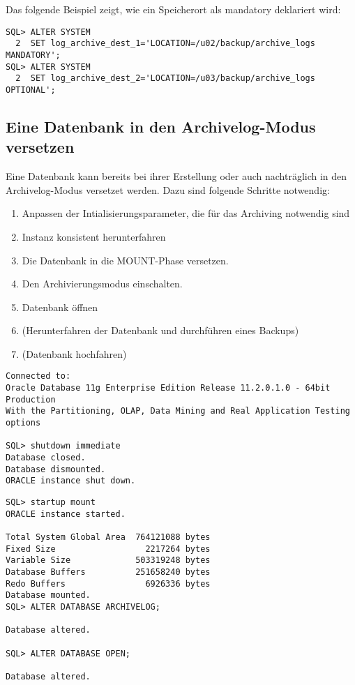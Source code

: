           Das folgende Beispiel zeigt, wie ein Speicherort als mandatory deklariert wird:
          \begin{lstlisting}[caption={\parameter{log\_archive\_dest\_n} als mandatory deklarieren},label=admin51,language=oracle_sql]
SQL> ALTER SYSTEM
  2  SET log_archive_dest_1='LOCATION=/u02/backup/archive_logs MANDATORY';
SQL> ALTER SYSTEM
  2  SET log_archive_dest_2='LOCATION=/u03/backup/archive_logs OPTIONAL';
          \end{lstlisting}
      \subsection{Eine Datenbank in den Archivelog-Modus versetzen}
        Eine Datenbank kann bereits bei ihrer Erstellung oder auch nachträglich in den Archivelog-Modus versetzet werden. Dazu sind folgende Schritte notwendig:
        \begin{enumerate}
          \item Anpassen der Intialisierungsparameter, die für das Archiving notwendig sind
          \item Instanz konsistent herunterfahren
          \item Die Datenbank in die MOUNT-Phase versetzen.
          \item Den Archivierungsmodus einschalten.
          \item Datenbank öffnen
          \item (Herunterfahren der Datenbank und durchführen eines Backups)
          \item (Datenbank hochfahren)
        \end{enumerate}
        \begin{lstlisting}[caption={Archivelog-Modus
        aktivieren},label=admin52,language=oracle_sql,alsolanguage=sqlplus] Connected to:
Oracle Database 11g Enterprise Edition Release 11.2.0.1.0 - 64bit Production
With the Partitioning, OLAP, Data Mining and Real Application Testing options

SQL> shutdown immediate
Database closed.
Database dismounted.
ORACLE instance shut down.
				\end{lstlisting}
\begin{lstlisting}[caption={Archivelog-Modus aktivieren -
Fortsetzung},label=admin52a,language=oracle_sql,alsolanguage=sqlplus]
SQL> startup mount 
ORACLE instance started.

Total System Global Area  764121088 bytes
Fixed Size                  2217264 bytes
Variable Size             503319248 bytes
Database Buffers          251658240 bytes
Redo Buffers                6926336 bytes
Database mounted.
SQL> ALTER DATABASE ARCHIVELOG;

Database altered.

SQL> ALTER DATABASE OPEN;

Database altered.
        \end{lstlisting}
